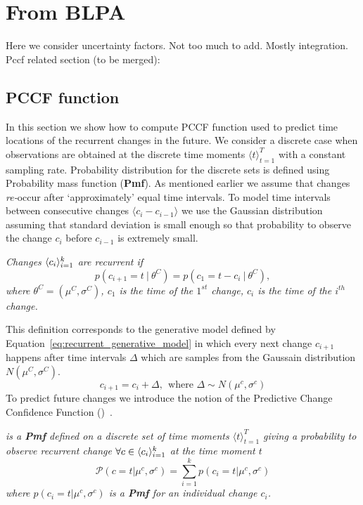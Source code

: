 \section{From BLPA}
Here we consider uncertainty factors.
Not too much to add. 
Mostly integration.
Pccf related section (to be merged): 

\subsection{PCCF function}
\label{subsec:pccf}
In this section we show how to compute PCCF function used to predict time locations of the recurrent changes in the future.
We consider a discrete case when observations are obtained at the
discrete time moments $\langle t \rangle_{t=1}^T$ with a constant sampling rate.
Probability distribution for the discrete sets is defined using
Probability mass function (\textbf{Pmf}).
As mentioned earlier we assume that changes \textit{re-}occur after
`approximately' equal time intervals.
To model time intervals between consecutive changes
$\langle c_i - c_{i-1} \rangle$
we use the Gaussian distribution assuming that standard deviation is small enough so that probability to observe the change $c_i$ before $c_{i-1}$ is extremely small.
\begin{definition}
    \label{def:recurrentdefinition}
    \textit{
        Changes $\langle c_i \rangle_{i=1}^k$ are recurrent if
    }
    \begin{equation}
        p(c_{i+1} = t \: | \: \theta^C) = p(c_1 = t - c_{i} \: | \: \theta^C),
        \label{eq:procnorefs}
    \end{equation}
    \textit{
        where
        $\theta^C=(\mu^C,\sigma^C)$,
        $c_1$ is the time of the $1^{st}$ change,
        $c_i$ is the time of the $i^{th}$ change.
    }
\end{definition}
%
This definition corresponds to the generative model defined by
Equation~\ref{eq:recurrent_generative_model} in which every next
change $c_{i+1}$ happens after time intervals $\Delta$ which are
samples from the Gaussain distribution $N(\mu^C, \sigma^C)$.
\begin{equation}
    c_{i+1} = c_i + \Delta,~~\text{where } \Delta \sim N(\mu^c, \sigma^c)
    \label{eq:recurrent_generative_model}
\end{equation}
%
To predict future changes we introduce the notion of the
Predictive Change Confidence Function (\PCCF)~\cite{MaslovSDM2016}.
\begin{definition}
    \label{def:pccf_definition}
    \textit{
        \PCCF is a \textbf{Pmf} defined on a discrete set of time moments
        $\langle t \rangle_{t=1}^T$ giving a probability
        to observe recurrent change $\forall c \in \langle  c_i  \rangle_{i=1}^k$
        at the time moment $t$
    }
    \begin{equation}
        \mathcal{P}(c=t|\mu^c,\sigma^c)=\sum_{i=1}^{k} p(c_i=t|\mu^c,\sigma^c)
    \end{equation}
    \textit{
        where $p(c_i=t|\mu^c,\sigma^c)$ is a \textbf{Pmf} for an
        individual change $c_i$.
    }
\end{definition}
